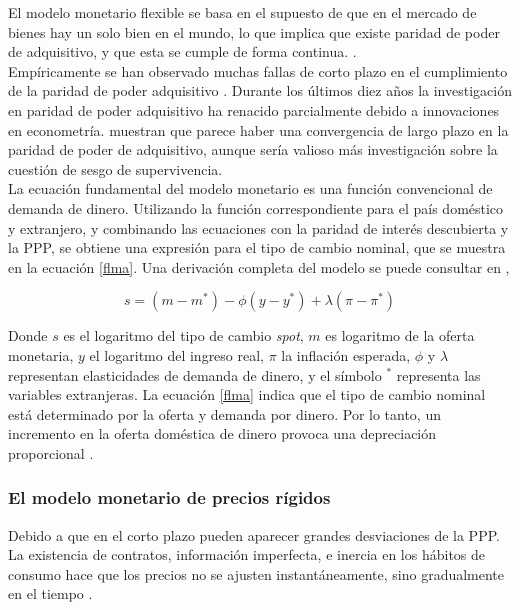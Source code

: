 	El modelo monetario flexible se basa en el supuesto de que en el mercado de bienes hay un solo bien en el mundo, lo que implica que existe paridad de poder de adquisitivo, y que esta se cumple de forma continua. \parencite{frankel1993exchange, exchecon}.\\
	
	Empíricamente se han observado muchas fallas de corto plazo en el cumplimiento de la paridad de poder adquisitivo \parencite{frankel1993exchange}. Durante los últimos diez años la investigación en paridad de poder adquisitivo ha renacido parcialmente debido a innovaciones en econometría. \textcite{froot1994perspectives} muestran que parece haber una convergencia de largo plazo en la paridad de poder de adquisitivo, aunque sería valioso más investigación sobre la cuestión de sesgo de supervivencia.\\
	
	La ecuación fundamental del modelo monetario es una función convencional de demanda de dinero. Utilizando la función correspondiente para el país doméstico y extranjero, y combinando las ecuaciones con la paridad de interés descubierta y la PPP, se obtiene una expresión para el tipo de cambio nominal, que se muestra en la ecuación \ref{flma}. Una derivación completa del modelo se puede consultar en \textcite[86]{frankel1993exchange}, 
	
	\begin{equation}
		s = (m - m^*) - \phi(y-y^*) + \lambda(\pi - \pi^*)
		\label{flma}
	\end{equation}
	
	Donde $s$ es el logaritmo del tipo de cambio \textit{spot}, $m$ es logaritmo de la oferta monetaria, $y$ el logaritmo del ingreso real, $\pi$ la inflación esperada, $\phi$ y $\lambda$ representan elasticidades de demanda de dinero, y el símbolo $^*$ representa las variables extranjeras. La ecuación \ref{flma} indica que el tipo de cambio nominal está determinado por la oferta y demanda por dinero. Por lo tanto, un incremento en la oferta doméstica de dinero provoca una depreciación proporcional \parencite{frankel1993exchange}.
	
	
	\subsubsection{El modelo monetario de precios rígidos}
	Debido a que en el corto plazo pueden aparecer grandes desviaciones de la PPP. La existencia de contratos, información imperfecta, e inercia en los hábitos de consumo hace que los precios no se ajusten instantáneamente, sino gradualmente en el tiempo \parencite{frankel1993exchange}.\\
	
